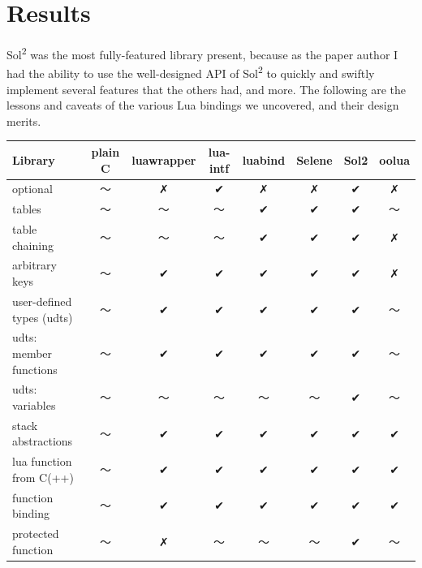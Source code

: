 \documentclass[conference,compsoc]{IEEEtran}
\newcommand{\soltwo}{Sol\textsuperscript{2}}
\begin{document}
\section{Results}

\soltwo{} was the most fully-featured library present, because as the paper author I had the ability to use the well-designed API of \soltwo{} to quickly and swiftly implement several features that the others had, and more. The following are the lessons and caveats of the various Lua bindings we uncovered, and their design merits.

\begin{table}[ht!]
	\centering
	\begin{tabular}{l c c c c c c c }
		Library                  &   plain C   & luawrapper & lua-intf & luabind &  Selene  &    Sol2   &   oolua   
		\\ \hline
		optional                  &      〜      &     ✗      &     ✔    &    ✗    &     ✗    &     ✔     &     ✗     
		\\ \hline
		tables                    &      〜      &     〜      &     〜    &    ✔    &     ✔    &     ✔     &     〜     
		\\ \hline
		table chaining            &      〜      &     〜      &     〜    &    ✔    &     ✔    &     ✔     &     ✗     
		\\ \hline
		arbitrary keys            &      〜      &     ✔      &     ✔    &    ✔    &     ✔    &     ✔     &     ✗     
		\\ \hline
		user-defined types (udts) &      〜      &     ✔      &     ✔    &    ✔    &     ✔    &     ✔     &     〜     
		\\ \hline
		udts: member functions    &      〜      &     ✔      &     ✔    &    ✔    &     ✔    &     ✔     &     〜     
		\\ \hline
		udts: variables           &      〜      &     〜      &     〜    &    〜    &     〜    &     ✔     &     〜     
		\\ \hline
		stack abstractions        &      〜      &     ✔      &     ✔    &    ✔    &     ✔    &     ✔     &     ✔     
		\\ \hline
		lua function from C(++)   &      〜      &     ✔      &     ✔    &    ✔    &     ✔    &     ✔     &     ✔     
		\\ \hline
		function binding          &      〜      &     ✔      &     ✔    &    ✔    &     ✔    &     ✔     &     ✔     
		\\ \hline
		protected function        &      〜      &     ✗      &     〜    &    〜    &     〜    &     ✔     &     〜     

\end{tabular}
\end{table}
\end{document}
